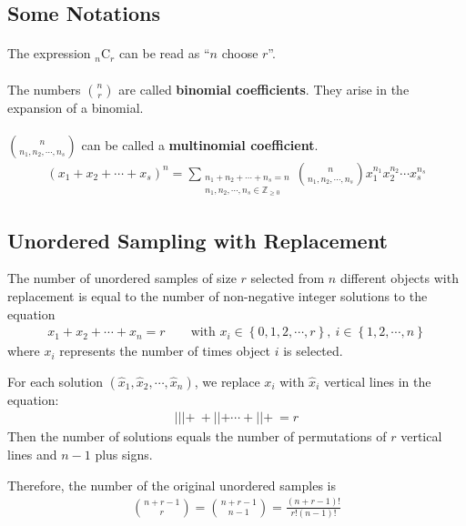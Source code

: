 \documentclass[10pt,UTF8]{article}
\newcommand{\comb}[2]{\ensuremath{{}_{#1}\mathrm{C}_{#2}}}  %
\begin{document}
\subsection{Some Notations}

\paragraph{}
The expression $\comb{n}{r}$ can be read as ``$n$ choose $r$''.

\paragraph{}
The numbers $\displaystyle\binom{n}{r}$ are called \textbf{binomial coefficients}.
They arise in the expansion of a binomial.

\paragraph{}
$\displaystyle\binom{n}{n_1,n_2,\cdots,n_s}$ can be called a \textbf{multinomial coefficient}.
\begin{gather*}
    \left(x_1+x_2+\cdots+x_s\right)^n = 
    \sum_{\substack{n_1+n_2+\cdots+n_s=n \\ n_1,n_2,\cdots,n_s\in\mathbb{Z}_{\geqslant 0}}}
    \binom{n}{n_1,n_2,\cdots,n_s}x_1^{n_1}x_2^{n_2}\cdots x_s^{n_s}
\end{gather*}


\subsection{Unordered Sampling with Replacement}

The number of unordered samples of size $r$ selected from $n$ different objects with replacement is equal to
the number of non-negative integer solutions to the equation
\begin{gather*}
    x_1+x_2+\cdots+x_n=r \qquad\text{with } x_i \in \left\{0,1,2,\cdots,r\right\},
    \ i\in\left\{1,2,\cdots,n\right\}
\end{gather*}
where $x_i$ represents the number of times object $i$ is selected.

For each solution $(\hat{x}_1,\hat{x}_2,\cdots,\hat{x}_n)$,
we replace $x_i$ with $\hat{x}_i$ vertical lines in the equation:
\begin{gather*}
    ||| + \ + || + \cdots + || +\  = r
\end{gather*}
Then the number of solutions equals the number of permutations of $r$ vertical lines and $n-1$ plus signs.

Therefore, the number of the original unordered samples is
\begin{gather*}
    \binom{n+r-1}{r} = \binom{n+r-1}{n-1} = \frac{(n+r-1)!}{r!(n-1)!}
\end{gather*}
\end{document}
